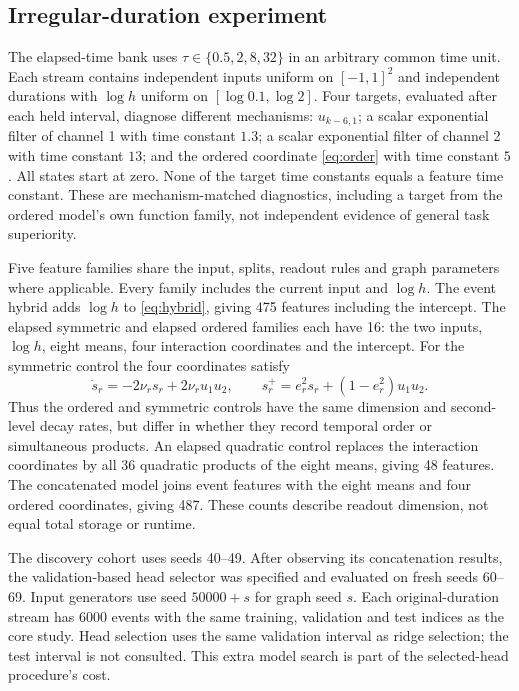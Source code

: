 \documentclass[11pt,a4paper]{article}
\theoremstyle{definition}\newtheorem{definition}[theorem]{Definition}
\begin{document}
\subsection{Irregular-duration experiment}
The elapsed-time bank uses $\tau\in\{0.5,2,8,32\}$ in an arbitrary common time unit. Each stream contains independent inputs uniform on $[-1,1]^2$ and independent durations with $\log h$ uniform on $[\log0.1,\log2]$. Four targets, evaluated after each held interval, diagnose different mechanisms: $u_{k-6,1}$; a scalar exponential filter of channel 1 with time constant $1.3$; a scalar exponential filter of channel 2 with time constant $13$; and the ordered coordinate \eqref{eq:order} with time constant $5$. All states start at zero. None of the target time constants equals a feature time constant. These are mechanism-matched diagnostics, including a target from the ordered model's own function family, not independent evidence of general task superiority.

Five feature families share the input, splits, readout rules and graph parameters where applicable. Every family includes the current input and $\log h$. The event hybrid adds $\log h$ to \eqref{eq:hybrid}, giving 475 features including the intercept. The elapsed symmetric and elapsed ordered families each have 16: the two inputs, $\log h$, eight means, four interaction coordinates and the intercept. For the symmetric control the four coordinates satisfy
\begin{equation}
 \dot s_r=-2\nu_r s_r+2\nu_r u_1u_2,\qquad
 s_r^+=e_r^2s_r+(1-e_r^2)u_1u_2.
\end{equation}
Thus the ordered and symmetric controls have the same dimension and second-level decay rates, but differ in whether they record temporal order or simultaneous products. An elapsed quadratic control replaces the interaction coordinates by all 36 quadratic products of the eight means, giving 48 features. The concatenated model joins event features with the eight means and four ordered coordinates, giving 487. These counts describe readout dimension, not equal total storage or runtime.

The discovery cohort uses seeds 40--49. After observing its concatenation results, the validation-based head selector was specified and evaluated on fresh seeds 60--69. Input generators use seed $50000+s$ for graph seed $s$. Each original-duration stream has 6000 events with the same training, validation and test indices as the core study. Head selection uses the same validation interval as ridge selection; the test interval is not consulted. This extra model search is part of the selected-head procedure's cost.
\end{document}
